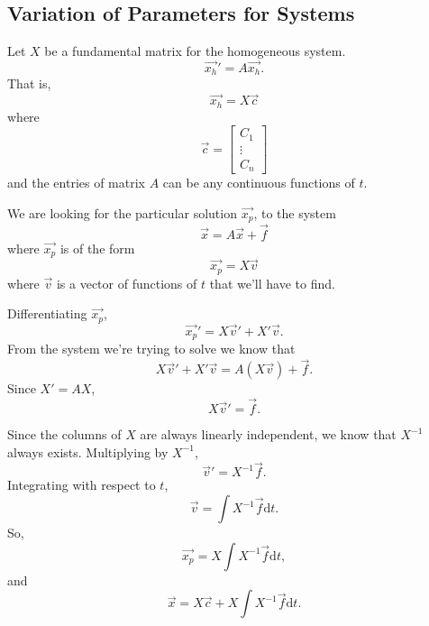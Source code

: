\subsection{Variation of Parameters for Systems}
\noindent
Let $X$ be a fundamental matrix for the homogeneous system.
\begin{equation*}
	\vec{x_h}' = A\vec{x_h}.
\end{equation*}
That is,
\begin{equation*}
	\vec{x_h} = X\vec{c}
\end{equation*}
where
\begin{equation*}
	\vec{c} = \begin{bmatrix}
	C_1 \\
	\vdots \\
	C_n
	\end{bmatrix}
\end{equation*}
and the entries of matrix $A$ can be any continuous functions of $t$.

\noindent
We are looking for the particular solution $\vec{x_p}$, to the system
\begin{equation*}
	\vec{x} = A\vec{x} + \vec{f}
\end{equation*}
where $\vec{x_p}$ is of the form
\begin{equation*}
	\vec{x_p} = X\vec{v}
\end{equation*}
where $\vec{v}$ is a vector of functions of $t$ that we'll have to find.

\noindent
Differentiating $\vec{x_p}$,
\begin{equation*}
	\vec{x_p}' = X\vec{v}' + X'\vec{v}.
\end{equation*}
From the system we're trying to solve we know that
\begin{equation*}
	X\vec{v}' + X'\vec{v} = A(X\vec{v}) + \vec{f}.
\end{equation*}
Since $X' = AX$,
\begin{equation*}
	X\vec{v}' = \vec{f}.
\end{equation*}

\noindent
Since the columns of $X$ are always linearly independent, we know that $X^{-1}$ always exists.
Multiplying by $X^{-1}$,
\begin{equation*}
	\vec{v}' = X^{-1}\vec{f}.
\end{equation*}
Integrating with respect to $t$,
\begin{equation*}
	\vec{v} = \int{X^{-1}\vec{f} \mathrm{d}t}.
\end{equation*}
So,
\begin{equation*}
	\vec{x_p} = X\int{X^{-1}\vec{f} \mathrm{d}t},
\end{equation*}
and
\begin{equation*}
	\vec{x} = X\vec{c} + X\int{X^{-1}\vec{f} \mathrm{d}t}.
\end{equation*}

